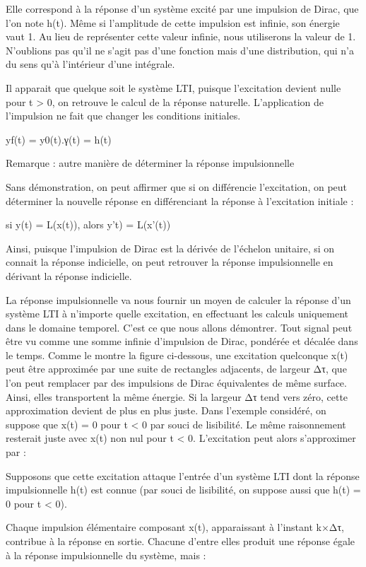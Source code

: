 \documentclass[]{article}
\begin{document}
Elle correspond à la réponse d'un système excité par une impulsion de
Dirac, que l'on note h(t). Même si l'amplitude de cette impulsion est
infinie, son énergie vaut 1. Au lieu de représenter cette valeur
infinie, nous utiliserons la valeur de 1. N'oublions pas qu'il ne s'agit
pas d'une fonction mais d'une distribution, qui n'a du sens qu'à
l'intérieur d'une intégrale.

Il apparait que quelque soit le système LTI, puisque l'excitation
devient nulle pour t \textgreater{} 0, on retrouve le calcul de la
réponse naturelle. L'application de l'impulsion ne fait que changer les
conditions initiales.

yf(t) = y0(t).γ(t) = h(t)

Remarque : autre manière de déterminer la réponse impulsionnelle

Sans démonstration, on peut affirmer que si on différencie l'excitation,
on peut déterminer la nouvelle réponse en différenciant la réponse à
l'excitation initiale :

si y(t) = L(x(t)), alors y't) = L(x'(t))

Ainsi, puisque l'impulsion de Dirac est la dérivée de l'échelon
unitaire, si on connait la réponse indicielle, on peut retrouver la
réponse impulsionnelle en dérivant la réponse indicielle.

La réponse impulsionnelle va nous fournir un moyen de calculer la
réponse d'un système LTI à n'importe quelle excitation, en effectuant
les calculs uniquement dans le domaine temporel. C'est ce que nous
allons démontrer. Tout signal peut être vu comme une somme infinie
d'impulsion de Dirac, pondérée et décalée dans le temps. Comme le montre
la figure ci-dessous, une excitation quelconque x(t) peut être
approximée par une suite de rectangles adjacents, de largeur Δτ, que
l'on peut remplacer par des impulsions de Dirac équivalentes de même
surface. Ainsi, elles transportent la même énergie. Si la largeur Δτ
tend vers zéro, cette approximation devient de plus en plus juste. Dans
l'exemple considéré, on suppose que x(t) = 0 pour t \textless{} 0 par
souci de lisibilité. Le même raisonnement resterait juste avec x(t) non
nul pour t \textless{} 0. L'excitation peut alors s'approximer par :

Supposons que cette excitation attaque l'entrée d'un système LTI dont la
réponse impulsionnelle h(t) est connue (par souci de lisibilité, on
suppose aussi que h(t) = 0 pour t \textless{} 0).

Chaque impulsion élémentaire composant x(t), apparaissant à l'instant
k×Δτ, contribue à la réponse en sortie. Chacune d'entre elles produit
une réponse égale à la réponse impulsionnelle du système, mais :
\end{document}
